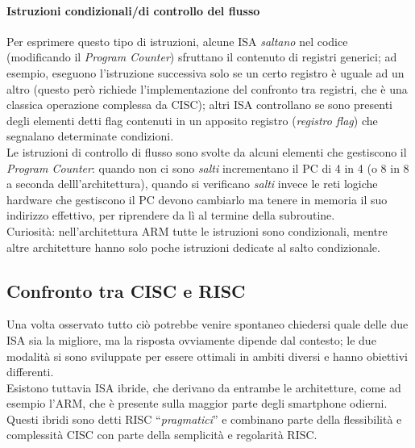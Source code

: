 \documentclass[class=book, crop=false]{standalone}
\begin{document}
\paragraph*{Istruzioni condizionali/di controllo del flusso}
Per esprimere questo tipo di istruzioni, alcune ISA \emph{saltano} nel codice (modificando il \emph{Program Counter}) sfruttano il contenuto di registri generici; ad esempio, eseguono l’istruzione successiva solo se un certo registro è uguale ad un altro (questo però richiede l’implementazione del confronto tra registri, che è una classica operazione complessa da CISC); altri ISA controllano se sono presenti  degli elementi detti flag contenuti in un apposito registro (\emph{registro flag}) che segnalano determinate condizioni.\\
Le istruzioni di controllo di flusso sono svolte da alcuni elementi che gestiscono il \emph{Program Counter}: quando non ci sono \emph{salti} incrementano il PC di 4 in 4 (o 8 in 8 a seconda delll’architettura), quando si verificano \emph{salti} invece le reti logiche hardware che gestiscono il PC devono cambiarlo ma tenere in memoria il suo indirizzo effettivo, per riprendere da lì al termine della subroutine.\\
Curiosità: nell'architettura ARM tutte le istruzioni sono condizionali, mentre altre architetture hanno solo poche istruzioni dedicate al salto condizionale.

\subsection{Confronto tra CISC e RISC}


Una volta osservato tutto ciò potrebbe venire spontaneo chiedersi quale delle due ISA sia la migliore, ma la risposta ovviamente dipende dal contesto; le due modalità si sono sviluppate per essere ottimali in ambiti diversi e hanno obiettivi differenti.\\
Esistono tuttavia ISA ibride, che derivano da entrambe le architetture, come ad esempio l’ARM, che è presente sulla maggior parte degli smartphone odierni. Questi ibridi sono detti RISC “\emph{pragmatici}” e combinano parte della flessibilità e complessità  CISC con parte della semplicità e regolarità RISC.
\end{document}
